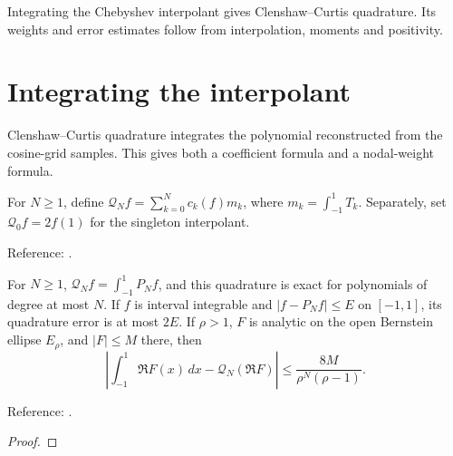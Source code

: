 
Integrating the Chebyshev interpolant gives Clenshaw--Curtis quadrature. Its weights and error estimates follow from interpolation, moments and positivity.

\section{Integrating the interpolant}\label{sec:textbook-cc-rule}

Clenshaw--Curtis quadrature integrates the polynomial reconstructed from the cosine-grid samples. This gives both a coefficient formula and a nodal-weight formula.

\begin{definition}
\label{def:clenshaw-curtis}
\leanok
For $N\ge1$, define $\mathcal Q_Nf=\sum_{k=0}^Nc_k(f)m_k$, where
$m_k=\int_{-1}^1T_k$. Separately, set $\mathcal Q_0f=2f(1)$ for the singleton interpolant.

Reference: \cite[Chapter 19]{atap}.
\end{definition}

\begin{theorem}
\label{thm:clenshaw-curtis-baseline}
\leanok
For $N\ge1$, $\mathcal Q_Nf=\int_{-1}^1P_Nf$, and this quadrature is exact
for polynomials of degree at most $N$. If $f$ is interval integrable and
$|f-P_Nf|\le E$ on $[-1,1]$, its quadrature error is at most $2E$.
If $\rho>1$, $F$ is analytic on the open Bernstein ellipse $E_\rho$, and
$|F|\le M$ there, then
\[
 \left|\int_{-1}^1\Re F(x)\,dx-\mathcal Q_N(\Re F)\right|
 \le\frac{8M}{\rho^N(\rho-1)}.
\]


Reference: \cite[Theorem 19.1 and proof of Theorem 19.3]{atap}.
\end{theorem}
\begin{proof}
\leanok
\end{proof}


